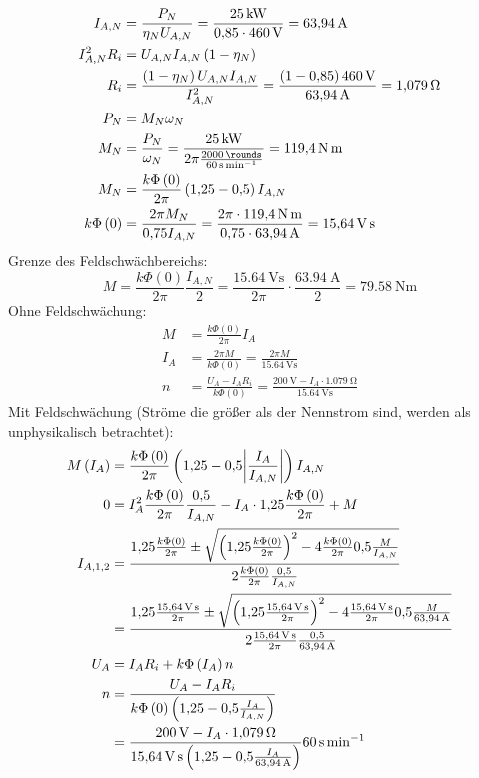 \documentclass[11pt,a4paper]{scrartcl}
\DeclarePairedDelimiter{\abs}{\lvert}{\rvert}
\newcommand{\mybr}[1]{\left(#1\right)}
\newcommand{\0}{_{\mybr{0}}}
\newcommand{\1}{_{\mybr{1}}}
\newcommand{\2}{_{\mybr{2}}}
\begin{document}
\subsection{}
\begin{align}
I_{A,N}&=\frac{P_N}{\eta_N U_{A,N}}=\frac{\SI{25}{\kilo\watt}}{\num{0.85}\cdot\SI{460}{\volt}}=\SI{63.94}{\ampere}\\
I_{A,N}^2 R_i&=U_{A,N} I_{A,N}\mybr{1-\eta_N}\\
R_i&=\frac{\mybr{1-\eta_N}U_{A,N}I_{A,N}}{I_{A,N}^2}=\frac{\mybr{1-\num{0.85}}\SI{460}{\volt}}{\SI{63.94}{\ampere}}=\SI{1.079}{\ohm}\\
P_N&=M_N \omega_N\\
M_N&=\frac{P_N}{\omega_N}=\frac{\SI{25}{\kilo\watt}}{2\pi\frac{\SI{2000}{\rounds}}{\SI{60}{\second\per\minute}}}=\SI{119.4}{\newton\metre}\\
M_N&=\frac{k\Phi\mybr{0}}{2\pi}\mybr{\num{1.25}-\num{0.5}}I_{A,N}\\
k\Phi\mybr{0}&=\frac{2\pi M_N}{\num{0.75}I_{A,N}}=\frac{2\pi\cdot\SI{119.4}{\newton\metre}}{\num{0.75}\cdot\SI{63.94}{\ampere}}=\SI{15.64}{\volt\second}
\end{align}
Grenze des Feldschwächbereichs:
\begin{equation}
M=\frac{k\Phi\mybr{0}}{2\pi}\frac{I_{A,N}}{2}=\frac{\SI{15.64}{\volt\second}}{2\pi}\cdot\frac{\SI{63.94}{\ampere}}{2}=\SI{79.58}{\newton\metre}
\end{equation}
Ohne Feldschwächung:
\begin{align}
M&=\frac{k\Phi\mybr{0}}{2\pi}I_A\\
I_A&=\frac{2\pi M}{k\Phi\mybr{0}}=\frac{2\pi M}{\SI{15.64}{\volt\second}}\\
n&=\frac{U_A-I_A R_i}{k\Phi\mybr{0}}=\frac{\SI{200}{\volt}-I_A\cdot\SI{1.079}{\ohm}}{\SI{15.64}{\volt\second}}
\end{align}
Mit Feldschwächung (Ströme die größer als der Nennstrom sind, werden als unphysikalisch betrachtet):
\begin{align}
M\mybr{I_A}&=\frac{k\Phi\mybr{0}}{2\pi}\mybr{\num{1.25}-\num{0.5}\abs*{\frac{I_A}{I_{A,N}}}}I_{A,N}\\
0&=I_A^2\frac{k\Phi\mybr{0}}{2\pi}\frac{\num{0.5}}{I_{A,N}}-I_A\cdot\num{1.25}\frac{k\Phi\mybr{0}}{2\pi}+M\\
I_{A,1,2}&=\frac{\num{1.25}\frac{k\Phi\mybr{0}}{2\pi}\pm\sqrt{\mybr{\num{1.25}\frac{k\Phi\mybr{0}}{2\pi}}^2-4\frac{k\Phi\mybr{0}}{2\pi}\num{0.5}\frac{M}{I_{A,N}}}}{2\frac{k\Phi\mybr{0}}{2\pi}\frac{\num{0.5}}{I_{A,N}}}\\
&=\frac{\num{1.25}\frac{\SI{15.64}{\volt\second}}{2\pi}\pm\sqrt{\mybr{\num{1.25}\frac{\SI{15.64}{\volt\second}}{2\pi}}^2-4\frac{\SI{15.64}{\volt\second}}{2\pi}\num{0.5}\frac{M}{\SI{63.94}{\ampere}}}}{2\frac{\SI{15.64}{\volt\second}}{2\pi}\frac{\num{0.5}}{\SI{63.94}{\ampere}}}\\
U_A&=I_A R_i+k \Phi\mybr{I_A}n\\
n&=\frac{U_A-I_A R_i}{k\Phi\mybr{0}\mybr{\num{1.25}-\num{0.5}\frac{I_A}{I_{A,N}}}}\\
&=\frac{\SI{200}{\volt}-I_A\cdot \SI{1.079}{\ohm}}{\SI{15.64}{\volt\second}\mybr{\num{1.25}-\num{0.5}\frac{I_A}{\SI{63.94}{\ampere}}}}\SI{60}{\second\per\minute}
\end{align}
\end{document}
